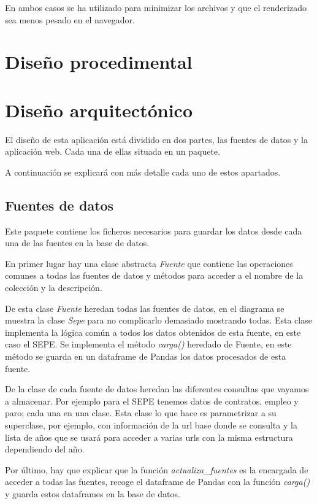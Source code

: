En ambos casos se ha utilizado  \cite{misc:mapshaper} para minimizar los archivos y que el renderizado sea menos pesado en el navegador.

\section{Diseño procedimental}

\section{Diseño arquitectónico}

El diseño de esta aplicación está dividido en dos partes, las fuentes de datos y la aplicación web. Cada una de ellas situada en un paquete.

A continuación se explicará con más detalle cada uno de estos apartados.

\subsection{Fuentes de datos}

Este paquete contiene los ficheros necesarios para guardar los datos desde cada una de las fuentes en la base de datos.

En primer lugar hay una clase abstracta \textit{Fuente} que contiene las operaciones comunes a todas las fuentes de datos y métodos para acceder a el nombre de la colección y la descripción.

De esta clase \textit{Fuente} heredan todas las fuentes de datos, en el diagrama se muestra la clase \textit{Sepe} para no complicarlo demasiado mostrando todas. Esta clase implementa la lógica común a todos los datos obtenidos de esta fuente, en este caso el SEPE. Se implementa el método \textit{carga()} heredado de Fuente, en este método se guarda en un dataframe de Pandas los datos procesados de esta fuente.

De la clase de cada fuente de datos heredan las diferentes consultas que vayamos a almacenar. Por ejemplo para el SEPE tenemos datos de contratos, empleo y paro; cada una en una clase. Esta clase lo que hace es parametrizar a su superclase, por ejemplo, con información de la url base donde se consulta y la lista de años que se usará para acceder a varias urls con la misma estructura dependiendo del año.

Por último, hay que explicar que la función \textit{actualiza\_fuentes} es la encargada de acceder a todas las fuentes, recoge el dataframe de Pandas con la función \textit{carga()} y guarda estos dataframes en la base de datos.

